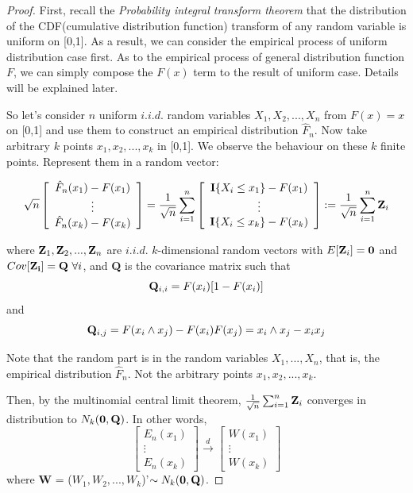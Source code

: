\documentclass[final_project_1.tex]{subfiles}
\begin{document}
\begin{proof}
First, recall the {\it Probability integral transform theorem} that the distribution of the  CDF(cumulative distribution function) transform of any random variable is uniform on [0,1]. As a result, we can consider the empirical process of uniform distribution case first. As to the empirical process of general distribution function $F$, we can simply compose the $F(x)$ term to the result of uniform case. Details will be explained later.

So let's consider $n$ uniform $i.i.d.$ random variables $X_1, X_2, ..., X_n$ from $F(x)=x$ on [0,1] and use them to construct an empirical distribution $\hat{F}_n$. Now take arbitrary $k$ points $x_1, x_2, ..., x_k$ in [0,1]. We observe the behaviour on these $k$ finite points. Represent them in a random vector:

\[ \sqrt{n} \left[ \begin{array}{c}
\hat{F}_n(x_1)-F(x_1) \\
\vdots \\
\hat{F}_n(x_k)-F(x_k) \end{array} \right]=
\frac{1}{\sqrt{n}}\sum^n_{i=1}
\left[ \begin{array}{c}
{\bf I}\{X_i\leq x_1\} - F(x_1) \\
\vdots \\
{\bf I}\{X_i\leq x_k\} - F(x_k)
\end{array} \right]:=
\frac{1}{\sqrt{n}}
\sum^n_{i=1}{\bf Z}_i
\]

where ${\bf Z}_1, {\bf Z}_2, ..., {\bf Z}_n$ are $i.i.d.$ $k$-dimensional random vectors with $E[{\bf Z}_i]={\bf 0}$ and $Cov[{\bf Z_i}]={\bf Q}\ \forall i$, and {\bf Q} is the covariance matrix such that
$${\bf Q}_{i,i} = F(x_i)[1-F(x_i)]$$
and
$${\bf Q}_{i,j}=F(x_i\wedge x_j)-F(x_i)F(x_j)=x_i\wedge x_j - x_ix_j$$

Note that the random part is in the random variables $X_1, ..., X_n$, that is, the empirical distribution $\hat{F}_n$. Not the arbitrary points $x_1, x_2, ..., x_k$.

Then, by the multinomial central limit theorem, $\frac{1}{\sqrt{n}}\sum^n_{i=1}{\bf Z}_i$ converges in distribution to $N_k({\bf 0}, {\bf Q})$. In other words, 
\[\left[ \begin{array}{c}
E_n(x_1)\\
\vdots\\
E_n(x_k)
\end{array} \right]
\xrightarrow{d}\left[ \begin{array}{c}
W(x_1)\\
\vdots\\
W(x_k)
\end{array}\right]
\]
where {\bf W} = ($W_1, W_2, ..., W_k$)'$\sim N_k({\bf 0}, {\bf Q})$.


\end{proof}
\end{document}
